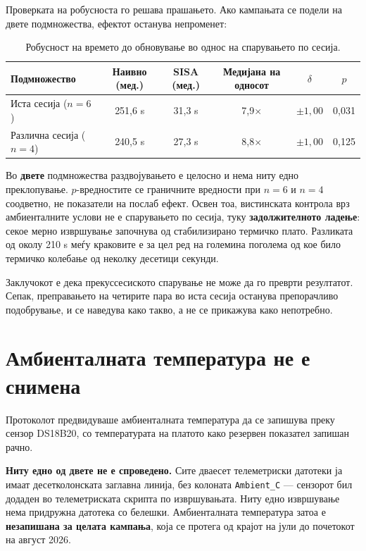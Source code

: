 Проверката на робусноста го решава прашањето. Ако кампањата се подели на двете подмножества,
ефектот останува непроменет:

\begin{table}[htbp]
\centering
\caption{Робусност на времето до обновување во однос на спарувањето по сесија.}
\label{tab:robustness-session}
\begin{tabular}{lccccc}
\toprule
Подмножество & Наивно (мед.) & SISA (мед.) & Медијана на односот & $\delta$ & $p$ \\
\midrule
Иста сесија ($n = 6$) & 251,6 s & 31,3 s & 7,9$\times$ & $\pm 1{,}00$ & 0,031 \\
Различна сесија ($n = 4$) & 240,5 s & 27,3 s & 8,8$\times$ & $\pm 1{,}00$ & 0,125 \\
\bottomrule
\end{tabular}
\end{table}

Во \textbf{двете} подмножества раздвојувањето е целосно и нема ниту едно преклопување.
$p$-вредностите се граничните вредности при $n = 6$ и $n = 4$ соодветно, не показатели на
послаб ефект. Освен тоа, вистинската контрола врз амбиенталните услови не е спарувањето по
сесија, туку \textbf{задолжителното ладење}: секое мерно извршување започнува од стабилизирано
термичко плато. Разликата од околу 210 s меѓу краковите е за цел ред на големина поголема
од кое било термичко колебање од неколку десетици секунди.

Заклучокот е дека прекуссесиското спарување не може да го преврти резултатот. Сепак,
преправањето на четирите пара во иста сесија останува препорачливо подобрување, и се
наведува како такво, а не се прикажува како непотребно.

\section{Амбиенталната температура не е снимена}

Протоколот предвидуваше амбиенталната температура да се запишува преку сензор DS18B20, со
температурата на платото како резервен показател запишан рачно.

\textbf{Ниту едно од двете не е спроведено.} Сите дваесет телеметриски датотеки ја имаат
десетколонската заглавна линија, без колоната \texttt{Ambient\_C} --- сензорот бил додаден во
телеметриската скрипта по извршувањата. Ниту едно извршување нема придружна датотека со
белешки. Амбиенталната температура затоа е \textbf{незапишана за целата кампања}, која се
протега од крајот на јули до почетокот на август 2026.

